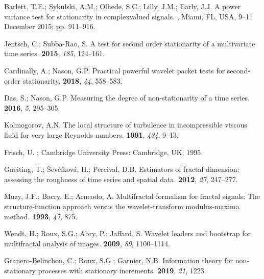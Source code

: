 \documentclass[aps,pra,groupedaddress,notitlepage]{revtex4-1}
\begin{document}
\begin{thebibliography}{999}
Barlett, T.E.; Sykulski, A.M.; Olhede, S.C.; Lilly, J.M.; Early, J.J.
\newblock A power variance test for stationarity in complexvalued signals.
, Miami, FL, USA,  9--11 December  2015;   pp. 911--916.

Jentsch, C.; Subba-Rao, S.
\newblock A test for second order stationarity of a multivariate time series.
  \textbf{2015}, \emph{185},   124--161.

Cardinally, A.; Nason, G.P.
\newblock Practical powerful wavelet packet tests for second-order
  stationarity.
  \textbf{2018}, \emph{44},   558--583.
  

Das, S.; Nason, G.P.
\newblock Measuring the degree of non-stationarity of a time series.
  \textbf{2016}, \emph{5},  295--305.

Kolmogorov, A.N.
\newblock The local structure of turbulence in incompressible viscous fluid for
  very large {R}eynolds numbers.
  \textbf{1991},
  \emph{434},  9--13.

Frisch, U.
;
\newblock Cambridge {U}niversity {P}ress:  Cambridge, UK, 1995.

Gneiting, T.; \v{S}ev\v{c}\'{i}kov\'{a}, H.; Percival, D.B.
\newblock Estimators of fractal dimension: assessing the roughness of time
  series and spatial data.
  \textbf{2012}, \emph{27},  247--277.

Muzy, J.F.; Bacry, E.; Arneodo, A.
\newblock Multifractal formalism for fractal signals: The structure-function
  approach versus the wavelet-transform modulus-maxima method.
  \textbf{1993}, \emph{47},  875.

Wendt, H.; Roux, S.G.; Abry, P.; Jaffard, S.
\newblock Wavelet leaders and bootstrap for multifractal analysis of images.
  \textbf{2009}, \emph{89},   1100--1114.

Granero-Belinchon, C.; Roux, S.G.; Garnier, N.B.
\newblock Information theory for non-stationary processes with stationary
  increments.
  \textbf{2019}, \emph{21},  1223.


\end{thebibliography}
\end{document}
